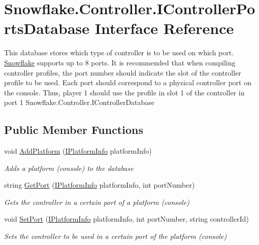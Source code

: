 \hypertarget{interface_snowflake_1_1_controller_1_1_i_controller_ports_database}{}\section{Snowflake.\+Controller.\+I\+Controller\+Ports\+Database Interface Reference}
\label{interface_snowflake_1_1_controller_1_1_i_controller_ports_database}


This database stores which type of controller is to be used on which port. \hyperlink{namespace_snowflake}{Snowflake} supports up to 8 ports. It is recommended that when compiling controller profiles, the port number should indicate the slot of the controller profile to be used. Each port should correspond to a physical controller port on the console. Thus, player 1 should use the profile in slot 1 of the controller in port 1 Snowflake.\+Controller.\+I\+Controller\+Database  


\subsection*{Public Member Functions}
\begin{DoxyCompactItemize}
\item 
void \hyperlink{interface_snowflake_1_1_controller_1_1_i_controller_ports_database_a9040495bc786b924c8d07796c8840635}{Add\+Platform} (\hyperlink{interface_snowflake_1_1_platform_1_1_i_platform_info}{I\+Platform\+Info} platform\+Info)
\begin{DoxyCompactList}\small\item\em Adds a platform (console) to the database \end{DoxyCompactList}\item 
string \hyperlink{interface_snowflake_1_1_controller_1_1_i_controller_ports_database_a427afda45c69d4c7be339bad5df63710}{Get\+Port} (\hyperlink{interface_snowflake_1_1_platform_1_1_i_platform_info}{I\+Platform\+Info} platform\+Info, int port\+Number)
\begin{DoxyCompactList}\small\item\em Gets the controller in a certain port of a platform (console) \end{DoxyCompactList}\item 
void \hyperlink{interface_snowflake_1_1_controller_1_1_i_controller_ports_database_a9c833ac0647f76f59b048c27e1a29807}{Set\+Port} (\hyperlink{interface_snowflake_1_1_platform_1_1_i_platform_info}{I\+Platform\+Info} platform\+Info, int port\+Number, string controller\+Id)
\begin{DoxyCompactList}\small\item\em Sets the controller to be used in a certain port of the platform (console) \end{DoxyCompactList}\end{DoxyCompactItemize}


